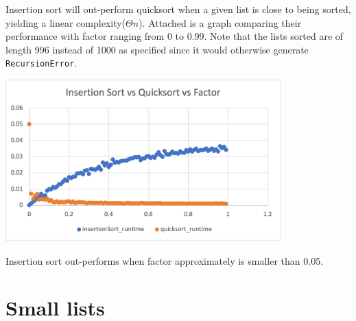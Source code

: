 \documentclass{article}
\begin{document}
\medskip
Insertion sort will out-perform quicksort when a given list is close to being sorted, 
yielding a linear complexity($\Theta{n}$). Attached is a graph comparing their 
performance with factor ranging from 0 to 0.99. Note that the lists sorted are of 
length 996 instead of 1000 as specified since it would otherwise generate \verb|RecursionError|.

\includegraphics[width=0.8\textwidth]{insertionSort_vs_quicksort_vs_factor}

Insertion sort out-performs when factor approximately is smaller than 0.05.

\section*{Small lists}
\end{document}
